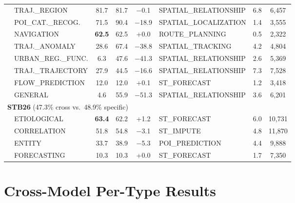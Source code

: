 \begin{table}[!htbp]
\begin{tabular}{l l cc c l cc}
& TRAJ.\_REGION                & 81.7  & 81.7  & $-$0.1 & SPATIAL\_RELATIONSHIP        & 6.8 & 6{,}457 \\
& POI\_CAT.\_RECOG.            & 71.5  & 90.4  & $-$18.9 & SPATIAL\_LOCALIZATION       & 1.4 & 3{,}555 \\
& NAVIGATION                   & \textbf{62.5}  & 62.5  & +0.0  & ROUTE\_PLANNING             & 0.5 & 2{,}322 \\
& TRAJ.\_ANOMALY               & 28.6  & 67.4  & $-$38.8 & SPATIAL\_TRACKING           & 4.2 & 4{,}804 \\
& URBAN\_REG.\_FUNC.           & 6.3   & 47.6  & $-$41.3 & SPATIAL\_RELATIONSHIP       & 2.6 & 5{,}369 \\
& TRAJ.\_TRAJECTORY            & 27.9  & 44.5  & $-$16.6 & SPATIAL\_RELATIONSHIP        & 7.3 & 7{,}528 \\
& FLOW\_PREDICTION             & 12.0  & 12.0  & +0.1  & ST\_FORECAST                 & 1.2 & 3{,}418 \\
& GENERAL                      & 4.6   & 55.9  & $-$51.3 & SPATIAL\_RELATIONSHIP        & 3.6 & 6{,}201 \\
\midrule
\multicolumn{8}{l}{\textbf{STB26} (47.3\% cross vs.\ 48.9\% specific)} \\
& ETIOLOGICAL                  & \textbf{63.4}  & 62.2  & +1.2  & ST\_FORECAST                 & 6.0 & 10{,}731 \\
& CORRELATION                  & 51.8  & 54.8  & $-$3.1 & ST\_IMPUTE                   & 4.8 & 11{,}870 \\
& ENTITY                       & 33.7  & 38.9  & $-$5.3 & POI\_PREDICTION              & 4.4 & 9{,}888 \\
& FORECASTING                  & 10.3  & 10.3  & +0.0  & ST\_FORECAST                 & 1.7 & 7{,}350 \\
\bottomrule
\end{tabular}
\end{table}

\FloatBarrier
\section{Cross-Model Per-Type Results}
\label{app:cross_model}


